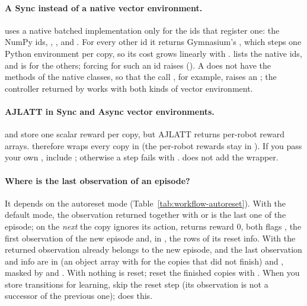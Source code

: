 \paragraph{A Sync instead of a native vector environment.}
 uses a native batched implementation only for the ids
that register one: the NumPy  ids,
, ,  and
. For every other id it returns Gymnasium's
, which steps one Python environment per copy, so its cost
grows linearly with .  lists the
native ids, and  is 
for the others; forcing  for
such an id raises  (). A
 does not have the methods of the native classes, so that
the call , for example, raises an
; the controller returned by
 works with both kinds of vector
environment.

\paragraph{AJLATT in Sync and Async vector environments.}
 and  store one scalar reward per copy,
but AJLATT returns per-robot reward arrays.  therefore
wraps every copy in  (the per-robot rewards stay in
). If you pass your own , include
; otherwise a step fails with .  does not add the
wrapper.

\paragraph{Where is the last observation of an episode?}
It depends on the autoreset mode (Table~\ref{tab:workflow-autoreset}). With the
default  mode, the observation returned together with
 or  is the last one of the episode; on the
\emph{next}  the copy ignores its action, returns reward 0, both
flags , the first observation of the new episode and, in
, the rows of its reset info. With  the returned
observation already belongs to the new episode, and the last observation and
info are in  (an object array with  for the
copies that did not finish) and , masked by
 and . With
 nothing is reset; reset the finished copies with
. When
you store transitions for learning, skip the  reset step (its
observation is not a successor of the previous one); 
does this.

